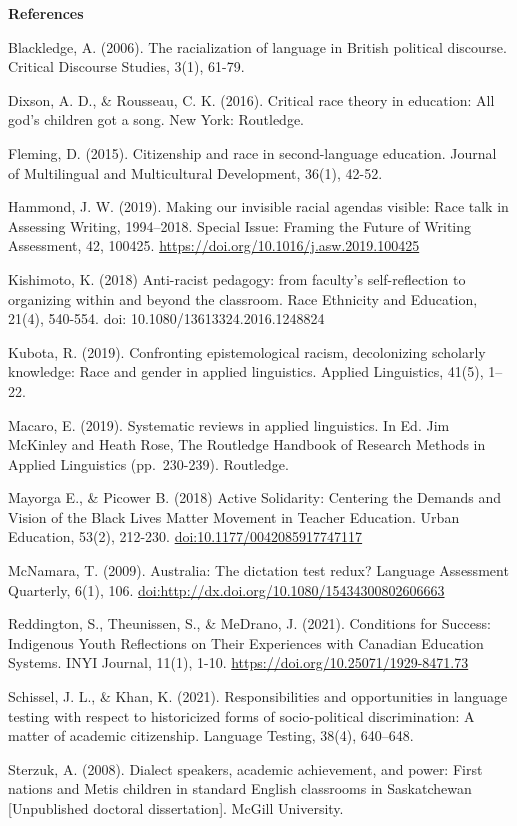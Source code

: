 \documentclass[
]{book}
\begin{document}
\textbf{References}

Blackledge, A. (2006). The racialization of language in British political discourse. Critical Discourse Studies, 3(1), 61-79.

Dixson, A. D., \& Rousseau, C. K. (2016). Critical race theory in education: All god's children got a song. New York: Routledge.

Fleming, D. (2015). Citizenship and race in second-language education. Journal of Multilingual and Multicultural Development, 36(1), 42-52.

Hammond, J. W. (2019). Making our invisible racial agendas visible: Race talk in Assessing Writing, 1994--2018. Special Issue: Framing the Future of Writing Assessment, 42, 100425. \url{https://doi.org/10.1016/j.asw.2019.100425}

Kishimoto, K. (2018) Anti-racist pedagogy: from faculty's self-reflection to organizing within and beyond the classroom. Race Ethnicity and Education, 21(4), 540-554. doi: 10.1080/13613324.2016.1248824

Kubota, R. (2019). Confronting epistemological racism, decolonizing scholarly knowledge: Race and gender in applied linguistics. Applied Linguistics, 41(5), 1--22.

Macaro, E. (2019). Systematic reviews in applied linguistics. In Ed. Jim McKinley and Heath Rose, The Routledge Handbook of Research Methods in Applied Linguistics (pp.~230-239). Routledge.

Mayorga E., \& Picower B. (2018) Active Solidarity: Centering the Demands and Vision of the Black Lives Matter Movement in Teacher Education. Urban Education, 53(2), 212-230. \url{doi:10.1177/0042085917747117}

McNamara, T. (2009). Australia: The dictation test redux? Language Assessment Quarterly, 6(1), 106. \url{doi:http://dx.doi.org/10.1080/15434300802606663}

Reddington, S., Theunissen, S., \& MeDrano, J. (2021). Conditions for Success: Indigenous Youth Reflections on Their Experiences with Canadian Education Systems. INYI Journal, 11(1), 1-10. \url{https://doi.org/10.25071/1929-8471.73}

Schissel, J. L., \& Khan, K. (2021). Responsibilities and opportunities in language testing with respect to historicized forms of socio-political discrimination: A matter of academic citizenship. Language Testing, 38(4), 640--648.

Sterzuk, A. (2008). Dialect speakers, academic achievement, and power: First nations and Metis children in standard English classrooms in Saskatchewan {[}Unpublished doctoral dissertation{]}. McGill University.
\end{document}
